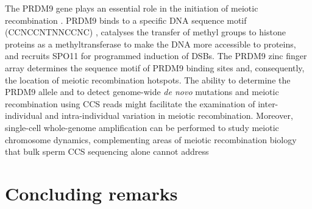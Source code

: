 
The PRDM9 gene plays an essential role in the initiation of meiotic recombination \cite{}.  PRDM9 binds to a specific DNA sequence motif (CCNCCNTNNCCNC) \cite{Myers2008-st}, catalyses the transfer of methyl groups to histone proteins as a methyltransferase \cite{} to make the DNA more accessible to proteins, and recruits SPO11 for programmed induction of DSBs. The PRDM9 zinc finger array determines the sequence motif of PRDM9 binding sites and, consequently, the location of meiotic recombination hotspots. The ability to determine the PRDM9 allele and to detect genome-wide \textit{de novo} mutations and meiotic recombination using CCS reads might facilitate the examination of inter-individual and intra-individual variation in meiotic recombination. Moreover, single-cell whole-genome amplification can be performed to study meiotic chromosome dynamics, complementing areas of meiotic recombination biology that bulk sperm CCS sequencing alone cannot address


\section{Concluding remarks}

